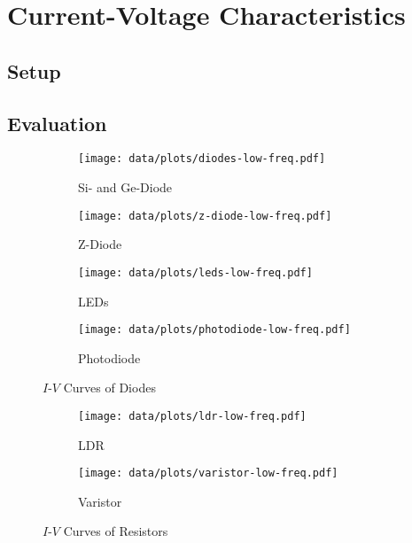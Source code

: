 \chapter{Current-Voltage Characteristics}

\section{Setup}

\section{Evaluation}

\def\ivsubfigwidth{0.45\textwidth}
\def\ivgraphicswidth{1.1\textwidth}

\begin{figure}[tbp]
	\centering

	\begin{subfigure}{\ivsubfigwidth}
		\centering
		\texttt{[image: data/plots/diodes-low-freq.pdf]}
		\caption{Si- and Ge-Diode}
		\label{plot:iv:si-ge-diode}
	\end{subfigure}
	\begin{subfigure}{\ivsubfigwidth}
		\centering
		\texttt{[image: data/plots/z-diode-low-freq.pdf]}
		\caption{Z-Diode}
		\label{plot:iv:z-diode}
	\end{subfigure}

	\begin{subfigure}{\ivsubfigwidth}
		\centering
		\texttt{[image: data/plots/leds-low-freq.pdf]}
		\caption{LEDs}
		\label{plot:iv:leds}
	\end{subfigure}
	\begin{subfigure}{\ivsubfigwidth}
		\centering
		\texttt{[image: data/plots/photodiode-low-freq.pdf]}
		\caption{Photodiode}
		\label{plot:iv:photodiode}
	\end{subfigure}

	\caption{$I$-$V$ Curves of Diodes}
	\label{plot:iv:diodes}
\end{figure}

\begin{figure}[tbp]
	\centering

	\begin{subfigure}{\ivsubfigwidth}
		\centering
		\texttt{[image: data/plots/ldr-low-freq.pdf]}
		\caption{LDR}
		\label{plot:iv:ldr}
	\end{subfigure}
	\begin{subfigure}{\ivsubfigwidth}
		\centering
		\texttt{[image: data/plots/varistor-low-freq.pdf]}
		\caption{Varistor}
		\label{plot:iv:varistor}
	\end{subfigure}

	\caption{$I$-$V$ Curves of Resistors}	%
	\label{plot:iv:boring}
\end{figure}
